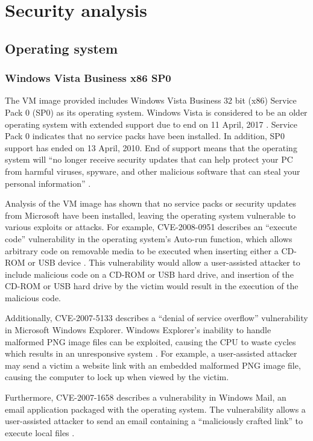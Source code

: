 \section{Security analysis}

\subsection{Operating system}

\subsubsection{Windows Vista Business x86 SP0}

The VM image provided includes Windows Vista Business 32 bit (x86) Service Pack 0 (SP0) as its operating system. Windows Vista is considered to be an older operating system with extended support due to end on 11 April, 2017 \citep{Microsoft2014}. Service Pack 0 indicates that no service packs have been installed. In addition, SP0 support has ended on 13 April, 2010. End of support means that the operating system will ``no longer receive security updates that can help protect your PC from harmful viruses, spyware, and other malicious software that can steal your personal information'' \citep{Microsoft2015}.

Analysis of the VM image has shown that no service packs or security updates from Microsoft have been installed, leaving the operating system vulnerable to various exploits or attacks. For example, CVE-2008-0951 describes an ``execute code'' vulnerability in the operating system's Auto-run function, which allows arbitrary code on removable media to be executed when inserting either a CD-ROM or USB device \citep{SecurityFocus2008}. This vulnerability would allow a user-assisted attacker to include malicious code on a CD-ROM or USB hard drive, and insertion of the CD-ROM or USB hard drive by the victim would result in the execution of the malicious code.

Additionally, CVE-2007-5133 describes a ``denial of service overflow'' vulnerability in Microsoft Windows Explorer. Windows Explorer's inability to handle malformed PNG image files can be exploited, causing the CPU to waste cycles which results in an unresponsive system \citep{SecurityFocus2007a}. For example, a user-assisted attacker may send a victim a website link with an embedded malformed PNG image file, causing the computer to lock up when viewed by the victim.

Furthermore, CVE-2007-1658 describes a vulnerability in Windows Mail, an email application packaged with the operating system. The vulnerability allows a user-assisted attacker to send an email containing a ``maliciously crafted link'' to execute local files \citep{SecurityFocus2007b}.

